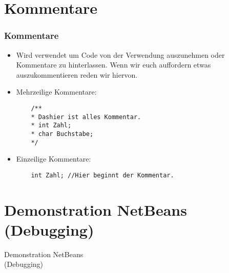 \documentclass[final]{beamer}
\begin{document}
\section{Kommentare}
\begin{frame}[fragile]
	\frametitle{Kommentare}
	\begin{itemize}
	\item Wird verwendet um Code von der Verwendung auszunehmen oder Kommentare zu hinterlassen. Wenn wir euch auffordern etwas auszukommentieren reden wir hiervon.
	\item Mehrzeilige Kommentare:
	\begin{lstlisting}
	/**
	* Dashier ist alles Kommentar.	
	* int Zahl;
	* char Buchstabe;	
	*/
	\end{lstlisting}
	\item Einzeilige Kommentare:
	\begin{lstlisting}
	int Zahl; //Hier beginnt der Kommentar.
	\end{lstlisting}
	\end{itemize}
\end{frame}

\section{Demonstration NetBeans (Debugging)}
\begin{frame}[fragile]
  \begin{center}
    \Huge{Demonstration NetBeans \\ (Debugging)}
  \end{center}
\end{frame}
\end{document}
